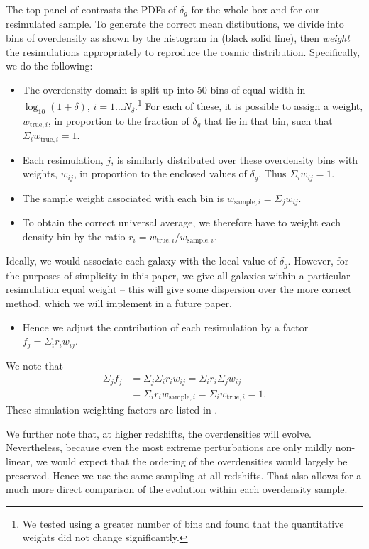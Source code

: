 The top panel of  contrasts the PDFs of $\delta_g$ for the whole box and for our resimulated sample.
To generate the correct mean distibutions, we divide into bins of overdensity as shown by the histogram in  (black solid line), then \textit{weight} the resimulations appropriately to reproduce the cosmic distribution.
Specifically, we do the following:
\begin{itemize}
\item The overdensity domain is split up into 50 bins of equal width in $\log_{10}(1+\delta)$, $i=1 \ldots N_\delta$.\footnote{We tested using a greater number of bins and found that the quantitative weights did not change significantly.}
For each of these, it is possible to assign a weight, $w_{\mathrm{true},i}$, in proportion to the fraction of $\delta_g$ that lie in that bin, such that $\Sigma_iw_{\mathrm{true},i}=1$.
\item Each resimulation, $j$, is similarly distributed over these overdensity bins with weights, $w_{ij}$, in proportion to the enclosed values of $\delta_g$.  Thus $\Sigma_iw_{ij}=1$.
\item The sample weight associated with each bin is $w_{\mathrm{sample},i}=\Sigma_jw_{ij}$.
\item To obtain the correct universal average, we therefore have to weight each density bin by the ratio $r_i=w_{\mathrm{true},i}/w_{\mathrm{sample},i}$.
\end{itemize}
Ideally, we would associate each galaxy with the local value of $\delta_g$.
However, for the purposes of simplicity in this paper, we give all galaxies within a particular resimulation equal weight -- this will give some dispersion over the more correct method, which we will implement in a future paper.
\begin{itemize}
\item Hence we adjust the contribution of each resimulation by a factor $f_{j}=\Sigma_ir_iw_{ij}$.
\end{itemize}
We note that
\begin{align}
  \Sigma_j f_j &= \Sigma_j \Sigma_i r_i w_{ij} = \Sigma_i r_i \Sigma_j w_{ij} \nonumber \\
  &= \Sigma_i r_i w_{\mathrm{sample},i} = \Sigma_i w_{\mathrm{true},i} =1.
\end{align}
These simulation weighting factors are listed in .

We further note that, at higher redshifts, the overdensities will evolve.
Nevertheless, because even the most extreme perturbations are only mildly non-linear, we would expect that the ordering of the overdensities would largely be preserved.
Hence we use the same sampling at all redshifts.
That also allows for a much more direct comparison of the evolution within each overdensity sample.
